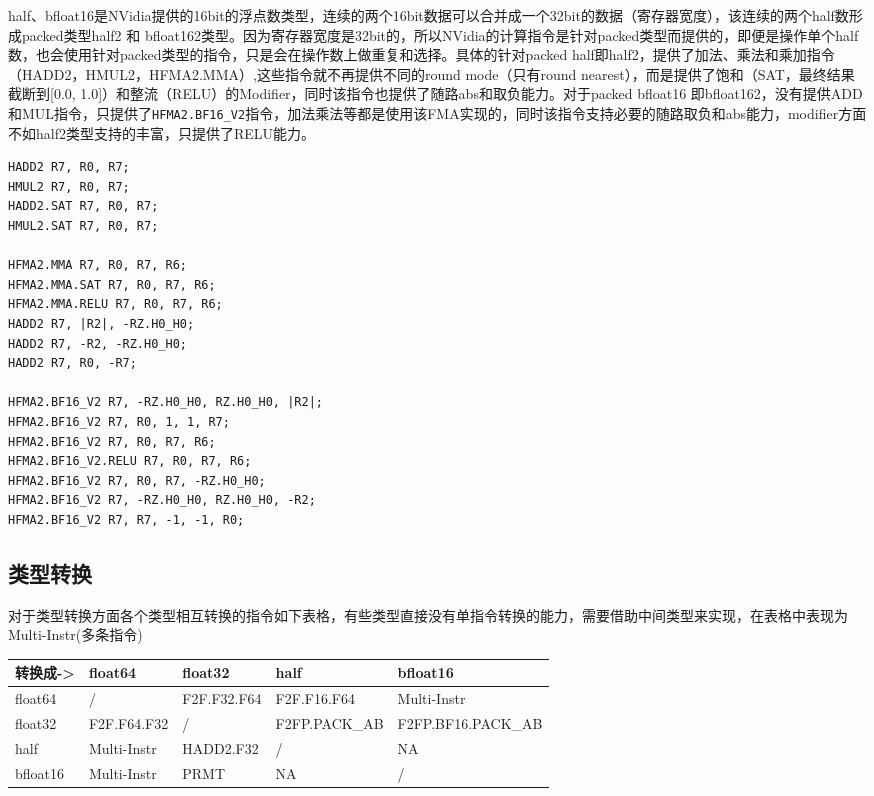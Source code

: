 half、bfloat16是NVidia提供的16bit的浮点数类型，连续的两个16bit数据可以合并成一个32bit的数据（寄存器宽度），该连续的两个half数形成packed类型half2 和 bfloat162类型。因为寄存器宽度是32bit的，所以NVidia的计算指令是针对packed类型而提供的，即便是操作单个half数，也会使用针对packed类型的指令，只是会在操作数上做重复和选择。具体的针对packed half即half2，提供了加法、乘法和乘加指令（HADD2，HMUL2，HFMA2.MMA）,这些指令就不再提供不同的round mode（只有round nearest），而是提供了饱和（SAT，最终结果截断到[0.0, 1.0]）和整流（RELU）的Modifier，同时该指令也提供了随路abs和取负能力。对于packed bfloat16 即bfloat162，没有提供ADD和MUL指令，只提供了\lstinline|HFMA2.BF16_V2|指令，加法乘法等都是使用该FMA实现的，同时该指令支持必要的随路取负和abs能力，modifier方面不如half2类型支持的丰富，只提供了RELU能力。

\begin{lstlisting}
HADD2 R7, R0, R7;
HMUL2 R7, R0, R7;
HADD2.SAT R7, R0, R7;
HMUL2.SAT R7, R0, R7;

HFMA2.MMA R7, R0, R7, R6;
HFMA2.MMA.SAT R7, R0, R7, R6;
HFMA2.MMA.RELU R7, R0, R7, R6;
HADD2 R7, |R2|, -RZ.H0_H0;
HADD2 R7, -R2, -RZ.H0_H0;
HADD2 R7, R0, -R7;

HFMA2.BF16_V2 R7, -RZ.H0_H0, RZ.H0_H0, |R2|;
HFMA2.BF16_V2 R7, R0, 1, 1, R7;
HFMA2.BF16_V2 R7, R0, R7, R6;
HFMA2.BF16_V2.RELU R7, R0, R7, R6;
HFMA2.BF16_V2 R7, R0, R7, -RZ.H0_H0;
HFMA2.BF16_V2 R7, -RZ.H0_H0, RZ.H0_H0, -R2;
HFMA2.BF16_V2 R7, R7, -1, -1, R0;
\end{lstlisting}

\subsection{类型转换}

对于类型转换方面各个类型相互转换的指令如下表格，有些类型直接没有单指令转换的能力，需要借助中间类型来实现，在表格中表现为Multi-Instr(多条指令)

\begin{table}[htbp]
\centering
\begin{tabular}{lllll}
\toprule
转换成-\textgreater{} & float64 & float32 & half & bfloat16 \\
\midrule
float64 & / & F2F.F32.F64 & F2F.F16.F64 & Multi-Instr \\
float32 & F2F.F64.F32 & / & F2FP.PACK\_AB & F2FP.BF16.PACK\_AB \\
half & Multi-Instr & HADD2.F32 & / & NA \\
bfloat16 & Multi-Instr & PRMT & NA & / \\
\bottomrule
\end{tabular}
\end{table}

